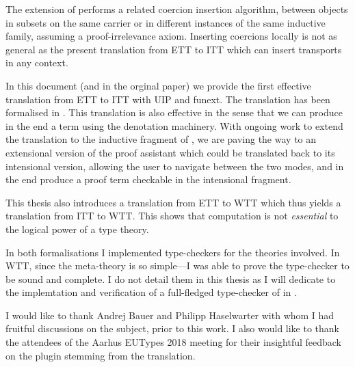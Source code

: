The   extension of \Coq performs a
related coercion insertion algorithm, between objects in subsets on the
same carrier or in different instances of the same inductive family,
assuming a proof-irrelevance axiom. Inserting coercions locally is not
as general as the present translation from \acrshort{ETT} to \acrshort{ITT}
which can insert transports in any context.

In this document (and in the orginal paper) we provide the first effective
translation from \acrshort{ETT} to \acrshort{ITT} with \acrshort{UIP} and
\acrshort{funext}. The translation has been formalised in \Coq.
This translation is also effective in the sense that we can produce in the end a
\Coq term using the \MetaCoq denotation machinery.
%
With ongoing work to extend the translation to the inductive fragment
of \Coq, we are paving the way to an extensional version of the \Coq
proof assistant which could be translated back to its intensional
version, allowing the user to navigate between the two modes, and in
the end produce a proof term checkable in the intensional fragment.

This thesis also introduces a translation from \acrshort{ETT} to \acrshort{WTT}
which thus yields a translation from \acrshort{ITT} to \acrshort{WTT}. This
shows that computation is not \emph{essential} to the logical power of a type
theory.

In both formalisations I implemented type-checkers for the theories involved.
In \acrshort{WTT}, since the meta-theory is so simple---I was able to prove the
type-checker to be sound and complete. I do not detail them in this thesis as
I will dedicate  to the implemtation and verification of
a full-fledged type-checker of \Coq in \Coq.


I would like to thank Andrej Bauer and Philipp Haselwarter with whom I had
fruitful discussions on the subject, prior to this work.
I also would like to thank the attendees of the Aarhus EUTypes 2018 meeting
for their insightful feedback on the plugin stemming from the translation.